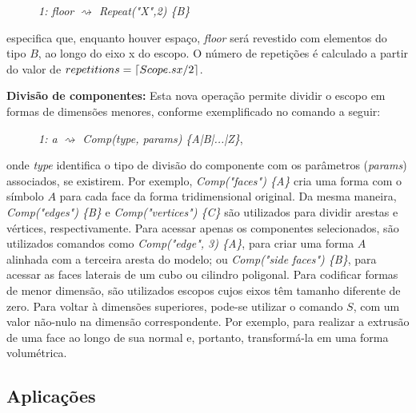 \vspace{0.3cm}

\begin{description}
    \item[] \qquad \qquad \textit{1: floor $\rightsquigarrow$ Repeat("X",2) \{B\}}
\end{description}

\vspace{0.3cm}

\noindent especifica que, enquanto houver espaço, \textit{floor} será revestido com elementos do tipo $B$, ao longo do eixo x do escopo. O número de repetições é calculado a partir do valor de $repetitions = \left\lceil Scope.sx/2 \right\rceil$.

\textbf{Divisão de componentes:} Esta nova operação permite dividir o escopo em formas de dimensões menores, conforme exemplificado no comando a seguir:

\vspace{0.3cm}

\begin{description}
    \item[] \qquad \qquad \textit{1: a $\rightsquigarrow$ Comp(type, params) \{A|B|...|Z\}},
\end{description}

\vspace{0.3cm}

\noindent onde \textit{type} identifica o tipo de divisão do componente com os parâmetros (\textit{params}) associados, se existirem. Por exemplo, \textit{Comp("faces") \{A\}} cria uma forma com o símbolo $A$ para cada face da forma tridimensional original. Da mesma maneira, \textit{Comp("edges") \{B\}} e \textit{Comp("vertices") \{C\}} são utilizados para dividir arestas e vértices, respectivamente. Para acessar apenas os componentes selecionados, são utilizados comandos como \textit{Comp("edge", 3) \{A\}}, para criar uma forma $A$ alinhada com a terceira aresta do modelo; ou \textit{Comp("side faces") \{B\}}, para acessar as faces laterais de um cubo ou cilindro poligonal. Para codificar formas de menor dimensão, são utilizados escopos cujos eixos têm tamanho diferente de zero. Para voltar à dimensões superiores, pode-se utilizar o comando $S$, com um valor não-nulo na dimensão correspondente. Por exemplo, para realizar a extrusão de uma face ao longo de sua normal e, portanto, transformá-la em uma forma volumétrica.

\subsection{Aplicações}
\label{sec:cga_exemplos}

